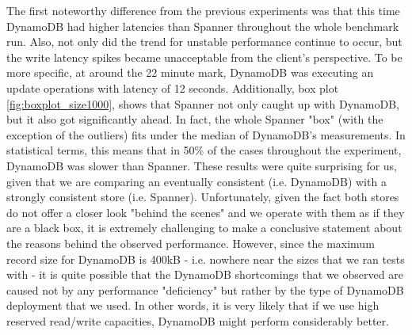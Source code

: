 \documentclass[letterpaper, 10 pt, conference]{ieeeconf}  %
\begin{document}
The first noteworthy difference from the previous experiments was that this time DynamoDB had higher latencies than Spanner throughout the whole benchmark run. Also, not only did the trend for unstable performance continue to occur, but the write latency spikes became unacceptable from the client's perspective. To be more specific, at around the 22 minute mark, DynamoDB was executing an update operations with latency of 12 seconds. Additionally, box plot \ref{fig:boxplot_size1000}, shows that Spanner not only caught up with DynamoDB, but it also got significantly ahead. In fact, the whole Spanner "box" (with the exception of the outliers) fits under the median of DynamoDB's measurements. In statistical terms, this means that in 50\% of the cases throughout the experiment, DynamoDB was slower than Spanner. These results were quite surprising for us, given that we are comparing an eventually consistent (i.e. DynamoDB) with a strongly consistent store (i.e. Spanner). Unfortunately, given the fact both stores do not offer a closer look "behind the scenes" and we operate with them as if they are a black box, it is extremely challenging to make a conclusive statement about the reasons behind the observed performance. However, since the maximum record size for DynamoDB is 400kB - i.e. nowhere near the sizes that we ran tests with - it is quite possible that the DynamoDB shortcomings that we observed are caused not by any performance "deficiency" but rather  by the type of DynamoDB deployment that we used. In other words, it is very likely that if we use high reserved read/write capacities, DynamoDB might perform considerably better.
\end{document}
